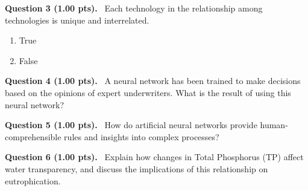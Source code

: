 \documentclass[12pt,a4paper]{article}
\begin{document}
\noindent
\textbf{Question 3 (1.00 pts).}~
Each technology in the relationship among technologies is unique and interrelated.


\begin{enumerate}[label=\textbf{\Alph*.}]
  \item True
  \item False
\end{enumerate}



\vspace{0.5em}


\noindent
\textbf{Question 4 (1.00 pts).}~
A neural network has been trained to make decisions based on the opinions of expert underwriters. What is the result of using this neural network?


\vspace{0.4cm}
\noindent\makebox[\linewidth]{\hrulefill}
\vspace{0.6cm}



\vspace{0.5em}


\noindent
\textbf{Question 5 (1.00 pts).}~
How do artificial neural networks provide human-comprehensible rules and insights into complex processes?


\vspace{0.4cm}
\noindent\makebox[\linewidth]{\hrulefill}
\vspace{0.6cm}



\vspace{0.5em}


\noindent
\textbf{Question 6 (1.00 pts).}~
Explain how changes in Total Phosphorus (TP) affect water transparency, and discuss the implications of this relationship on eutrophication.


\vspace{0.4cm}
\noindent\makebox[\linewidth]{\hrulefill}
\vspace{0.4cm}
\noindent\makebox[\linewidth]{\hrulefill}
\vspace{0.4cm}
\noindent\makebox[\linewidth]{\hrulefill}
\vspace{0.6cm}
\end{document}
